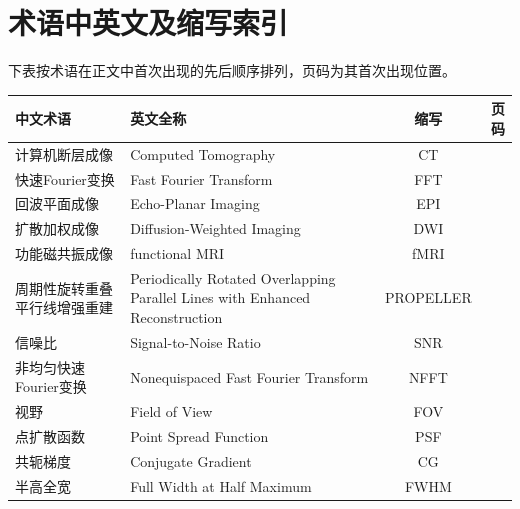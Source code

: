 \documentclass[12pt]{article}
\begin{document}
\section{术语中英文及缩写索引}
下表按术语在正文中首次出现的先后顺序排列，页码为其首次出现位置。
\begin{table}[h]
    \small
    \centering
    \begin{tabularx}{\textwidth}{l X c r}
        \toprule
        \textbf{中文术语} & \textbf{英文全称} & \textbf{缩写} & \textbf{页码} \\
        \midrule
        计算机断层成像 & Computed Tomography & CT & \pageref{term:CT} \\
        快速Fourier变换 & Fast Fourier Transform & FFT & \pageref{term:FFT} \\
        回波平面成像 & Echo-Planar Imaging & EPI & \pageref{term:EPI} \\
        扩散加权成像 & Diffusion-Weighted Imaging & DWI & \pageref{term:DWI} \\
        功能磁共振成像 & functional MRI & fMRI & \pageref{term:fMRI} \\
        周期性旋转重叠平行线增强重建 & Periodically Rotated Overlapping Parallel Lines with Enhanced Reconstruction & PROPELLER & \pageref{term:PROPELLER} \\
        信噪比 & Signal-to-Noise Ratio & SNR & \pageref{term:SNR} \\
        非均匀快速Fourier变换 & Nonequispaced Fast Fourier Transform & NFFT & \pageref{term:NFFT} \\
        视野 & Field of View & FOV & \pageref{term:FOV} \\
        点扩散函数 & Point Spread Function & PSF & \pageref{term:PSF} \\
        共轭梯度 & Conjugate Gradient & CG & \pageref{term:CG} \\
        半高全宽 & Full Width at Half Maximum & FWHM & \pageref{term:FWHM} \\
        \bottomrule
    \end{tabularx}
\end{table}
\end{document}

